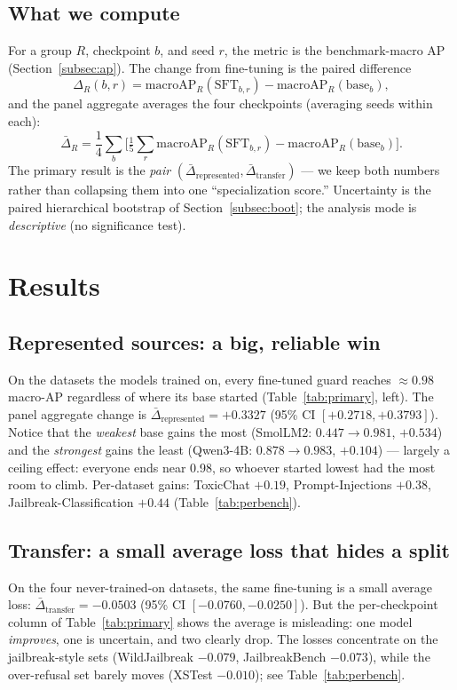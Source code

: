 \documentclass[11pt]{article}
\begin{document}
\subsection{What we compute}
For a group $R$, checkpoint $b$, and seed $r$, the metric is the benchmark-macro AP
(Section~\ref{subsec:ap}). The change from fine-tuning is the paired difference
\[
\Delta_R(b,r) = \text{macroAP}_R(\text{SFT}_{b,r}) - \text{macroAP}_R(\text{base}_b),
\]
and the panel aggregate averages the four checkpoints (averaging seeds within each):
\[
\bar\Delta_R = \frac{1}{4}\sum_b\Big[\tfrac{1}{5}\sum_r \text{macroAP}_R(\text{SFT}_{b,r}) -
\text{macroAP}_R(\text{base}_b)\Big].
\]
The primary result is the \emph{pair}
$(\bar\Delta_{\text{represented}}, \bar\Delta_{\text{transfer}})$ --- we keep both numbers
rather than collapsing them into one ``specialization score.'' Uncertainty is the paired
hierarchical bootstrap of Section~\ref{subsec:boot}; the analysis mode is
\emph{descriptive} (no significance test).

\section{Results}

\subsection{Represented sources: a big, reliable win}
On the datasets the models trained on, every fine-tuned guard reaches ${\approx}0.98$
macro-AP regardless of where its base started (Table~\ref{tab:primary}, left). The panel
aggregate change is $\bar\Delta_{\text{represented}} = \mathbf{+0.3327}$ (95\% CI
$[+0.2718, +0.3793]$). Notice that the \emph{weakest} base gains the most (SmolLM2:
$0.447\!\to\!0.981$, $+0.534$) and the \emph{strongest} gains the least (Qwen3-4B:
$0.878\!\to\!0.983$, $+0.104$) --- largely a ceiling effect: everyone ends near 0.98, so
whoever started lowest had the most room to climb. Per-dataset gains: ToxicChat $+0.19$,
Prompt-Injections $+0.38$, Jailbreak-Classification $+0.44$ (Table~\ref{tab:perbench}).

\subsection{Transfer: a small average loss that hides a split}
On the four never-trained-on datasets, the same fine-tuning is a small average loss:
$\bar\Delta_{\text{transfer}} = \mathbf{-0.0503}$ (95\% CI $[-0.0760, -0.0250]$). But the
per-checkpoint column of Table~\ref{tab:primary} shows the average is misleading: one model
\emph{improves}, one is uncertain, and two clearly drop. The losses concentrate on the
jailbreak-style sets (WildJailbreak $-0.079$, JailbreakBench $-0.073$), while the
over-refusal set barely moves (XSTest $-0.010$); see Table~\ref{tab:perbench}.
\end{document}
